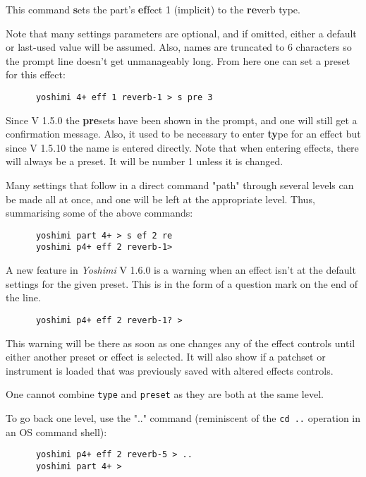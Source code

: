    This command \textbf{s}ets the part's \textbf{ef}fect 1 (implicit) to the
   \textbf{re}verb type.

   Note that many settings parameters are optional, and if omitted, either a
   default or last-used value will be assumed. Also, names are truncated to
   6 characters so the prompt line doesn't get unmanageably long. From here
   one can set a preset for this effect:

   \begin{verbatim}
      yoshimi 4+ eff 1 reverb-1 > s pre 3
   \end{verbatim}

   Since V 1.5.0 the \textbf{pre}sets have been shown in the prompt, and one
   will still get a confirmation message. Also, it used to be necessary to
   enter \textbf{ty}pe for an effect but since V 1.5.10 the name is entered
   directly. Note that when entering effects, there will always be a preset.
   It will be number 1 unless it is changed.

   Many settings that follow in a direct command "path" through several
   levels can be made all at once, and one will be left at the appropriate
   level. Thus, summarising some of the above commands:

   \begin{verbatim}
      yoshimi part 4+ > s ef 2 re
      yoshimi p4+ eff 2 reverb-1>
   \end{verbatim}

   A new feature in \textsl{Yoshimi} V 1.6.0 is a warning when an effect
   isn't at the default settings for the given preset. This is in the form
   of a question mark on the end of the line.
   \begin{verbatim}
      yoshimi p4+ eff 2 reverb-1? >
   \end{verbatim}
   This warning will be there as soon as one changes any of the effect
   controls until either another preset or effect is selected. It will also
   show if a patchset or instrument is loaded that was previously saved with
   altered effects controls.

   One cannot combine \texttt{type} and \texttt{preset} as they
   are both at the same level.

   To go back one level, use the ".." command (reminiscent of the
   \texttt{cd ..} operation in an OS command shell):

   \begin{verbatim}
      yoshimi p4+ eff 2 reverb-5 > ..
      yoshimi part 4+ >
   \end{verbatim}


